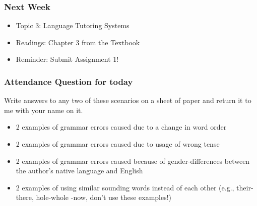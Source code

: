 \documentclass{beamer}
\begin{document}
\begin{frame}
\frametitle{Next Week}
\begin{itemize}
\item Topic 3: Language Tutoring Systems
\item Readings: Chapter 3 from the Textbook
\item Reminder: Submit Assignment 1!
\end{itemize}
\end{frame}

\begin{frame}
\frametitle{Attendance Question for today}
Write answers to any two of these scenarios on a sheet of paper and return it to me with your name on it. 
\begin{itemize}
\item 2 examples of grammar errors caused due to a change in word order
\item 2 examples of grammar errors caused due to usage of wrong tense
\item 2 examples of grammar errors caused because of gender-differences between the author's native language and English
\item 2 examples of using similar sounding words instead of each other (e.g., their-there, hole-whole -now, don't use these examples!)
\end{itemize}
\end{frame}
\end{document}
